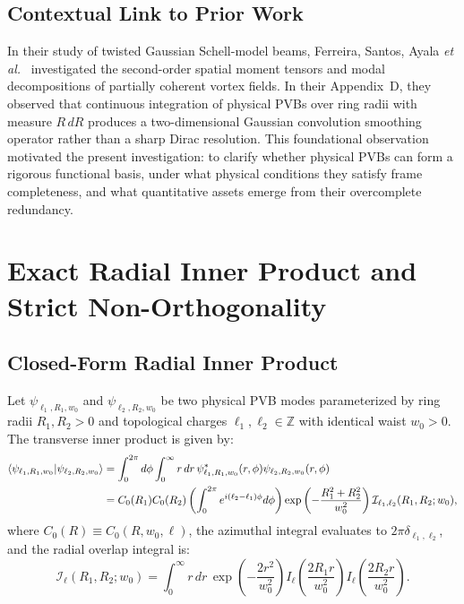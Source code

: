 \documentclass[11pt,a4paper]{article}
\begin{document}
\subsection{Contextual Link to Prior Work}

In their study of twisted Gaussian Schell-model beams, Ferreira, Santos, Ayala \emph{et al.}~\cite{Ferreira2026} investigated the second-order spatial moment tensors and modal decompositions of partially coherent vortex fields. In their Appendix~D, they observed that continuous integration of physical PVBs over ring radii with measure $R \, dR$ produces a two-dimensional Gaussian convolution smoothing operator rather than a sharp Dirac resolution. This foundational observation motivated the present investigation: to clarify whether physical PVBs can form a rigorous functional basis, under what physical conditions they satisfy frame completeness, and what quantitative assets emerge from their overcomplete redundancy.

\section{Exact Radial Inner Product and Strict Non-Orthogonality}
\label{sec:inner_product}

\subsection{Closed-Form Radial Inner Product}

Let $\psi_{\ell_1, R_1, w_0}$ and $\psi_{\ell_2, R_2, w_0}$ be two physical PVB modes parameterized by ring radii $R_1, R_2 > 0$ and topological charges $\ell_1, \ell_2 \in \mathbb{Z}$ with identical waist $w_0 > 0$. The transverse inner product is given by:
\begin{align}
\langle \psi_{\ell_1, R_1, w_0} | \psi_{\ell_2, R_2, w_0} \rangle &= \int_0^{2\pi} d\phi \int_0^\infty r \, dr \, \psi_{\ell_1, R_1, w_0}^*(r, \phi) \psi_{\ell_2, R_2, w_0}(r, \phi) \notag \\
&= C_0(R_1) C_0(R_2) \left( \int_0^{2\pi} e^{i(\ell_2 - \ell_1)\phi} d\phi \right) \exp\left( - \frac{R_1^2 + R_2^2}{w_0^2} \right) \mathcal{I}_{\ell_1, \ell_2}(R_1, R_2; w_0),
\label{eq:inner_product_setup}
\end{align}
where $C_0(R) \equiv C_0(R, w_0, \ell)$, the azimuthal integral evaluates to $2\pi \delta_{\ell_1, \ell_2}$, and the radial overlap integral is:
\begin{equation}
\mathcal{I}_\ell(R_1, R_2; w_0) = \int_0^\infty r \, dr \, \exp\left( - \frac{2 r^2}{w_0^2} \right) I_\ell\left( \frac{2 R_1 r}{w_0^2} \right) I_\ell\left( \frac{2 R_2 r}{w_0^2} \right).
\label{eq:radial_overlap_integral}
\end{equation}
\end{document}
